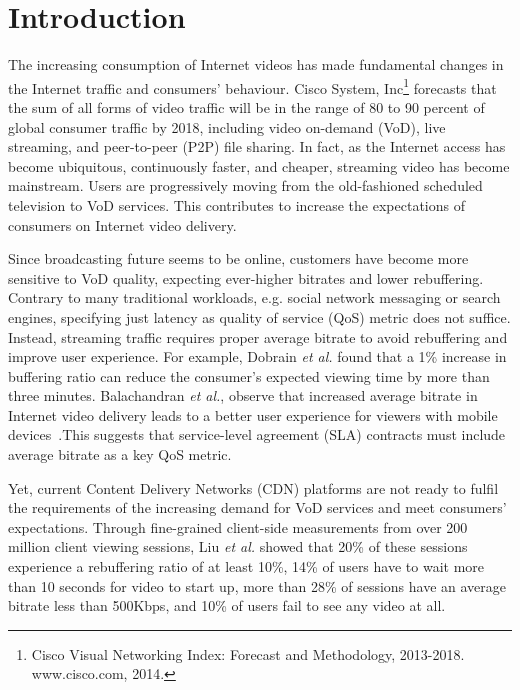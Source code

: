 \section{Introduction}

The increasing consumption of Internet videos has made fundamental changes in the Internet traffic and consumers' behaviour. Cisco System, Inc\footnote{Cisco Visual Networking Index: Forecast and Methodology, 2013-2018. www.cisco.com, 2014.} forecasts that the sum of all forms of video traffic will be in the range of 80 to 90 percent of global consumer traffic by 2018, including video on-demand (VoD), live streaming, and peer-to-peer (P2P) file sharing. In fact, as the Internet access has become ubiquitous, continuously faster, and cheaper, streaming video has become mainstream. Users are progressively moving from the old-fashioned scheduled television to VoD services. This contributes to increase the expectations of consumers on Internet video delivery. 

Since broadcasting future seems to be online, customers have become more sensitive to VoD quality, expecting ever-higher bitrates and lower rebuffering. Contrary to many traditional workloads, e.g. social network messaging or search engines, specifying just latency as quality of service (QoS) metric does not suffice. Instead, streaming traffic requires proper average bitrate to avoid rebuffering and improve user experience. For example, Dobrain \emph{et al.}\cite{Dobrian_sigcomm_2011} found that a 1\% increase in buffering ratio can reduce the consumer's expected viewing time by more than three minutes. Balachandran \emph{et al.}, observe that increased average bitrate in Internet video delivery leads to a better user experience for viewers with mobile devices~\cite{balachandran2013developing}.This suggests that service-level agreement (SLA) contracts must include average bitrate as a key QoS metric. 

Yet, current Content Delivery Networks (CDN) platforms are not ready to fulfil the requirements of the increasing demand for VoD services and meet consumers' expectations. Through fine-grained client-side measurements from over 200 million client viewing sessions, Liu \emph{et al.}\cite{Liu_sigcomm_2012} showed that 20\% of these sessions experience a rebuffering ratio of at least 10\%, 14\% of users have to wait more than 10 seconds for video to start up, more than 28\% of sessions have an average bitrate less than 500Kbps, and 10\% of users fail to see any video at all.

